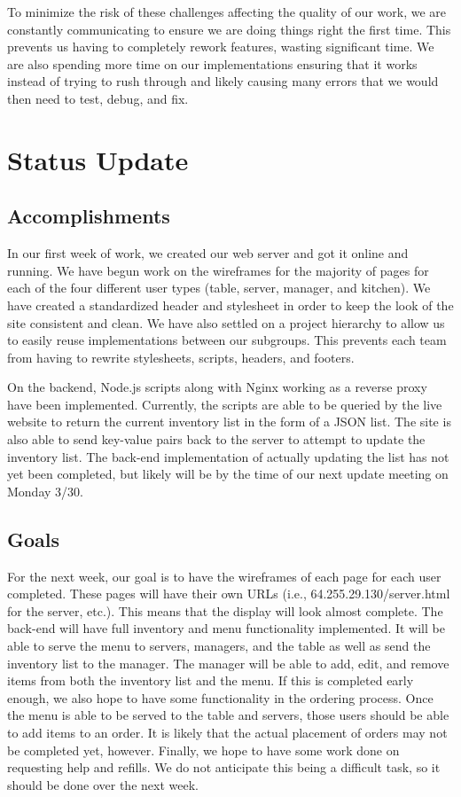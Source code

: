 \documentclass[12pt]{article}
\begin{document}
		To minimize the risk of these challenges affecting the quality of our work, we are constantly communicating to ensure we are doing things right the first time. This prevents us having to completely rework features, wasting significant time. We are also spending more time on our implementations ensuring that it works instead of trying to rush through and likely causing many errors that we would then need to test, debug, and fix.


	\section{Status Update}
		\subsection{Accomplishments}
			In our first week of work, we created our web server and got it online and running. We have begun work on the wireframes for the majority of pages for each of the four different user types (table, server, manager, and kitchen). We have created a standardized header and stylesheet in order to keep the look of the site consistent and clean. We have also settled on a project hierarchy to allow us to easily reuse implementations between our subgroups. This prevents each team from having to rewrite stylesheets, scripts, headers, and footers.

			On the backend, Node.js scripts along with Nginx working as a reverse proxy have been implemented. Currently, the scripts are able to be queried by the live website to return the current inventory list in the form of a JSON list. The site is also able to send key-value pairs back to the server to attempt to update the inventory list. The back-end implementation of actually updating the list has not yet been completed, but likely will be by the time of our next update meeting on Monday 3/30.


		\subsection{Goals}
			For the next week, our goal is to have the wireframes of each page for each user completed. These pages will have their own URLs (i.e., 64.255.29.130/server.html for the server, etc.). This means that the display will look almost complete. The back-end will have full inventory and menu functionality implemented. It will be able to serve the menu to servers, managers, and the table as well as send the inventory list to the manager. The manager will be able to add, edit, and remove items from both the inventory list and the menu. If this is completed early enough, we also hope to have some functionality in the ordering process. Once the menu is able to be served to the table and servers, those users should be able to add items to an order. It is likely that the actual placement of orders may not be completed yet, however. Finally, we hope to have some work done on requesting help and refills. We do not anticipate this being a difficult task, so it should be done over the next week.
\end{document}
